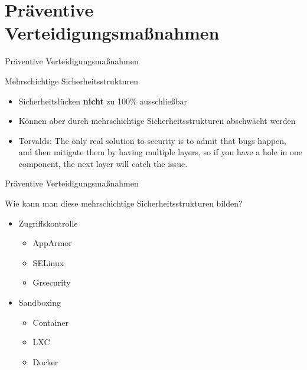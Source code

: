 \newcommand{\gqq}[1]{\glqq#1\grqq}

\section{Präventive Verteidigungsmaßnahmen}

\begin{frame}{Präventive Verteidigungsmaßnahmen}
  \begin{block}{Mehrschichtige Sicherheitsstrukturen}
    \begin{itemize}[<+->]
      \item Sicherheitslücken \textbf{nicht} zu 100\% ausschließbar
      \item Können aber durch mehrschichtige Sicherheitsstrukturen abschwächt werden
      \item Torvalds: \gqq{The only real solution to security is to admit that bugs happen, and then mitigate them by having multiple layers, so if you have a hole in one component, the next layer will catch the issue.} \footnotemark
    \end{itemize}
  \end{block}

\end{frame}

\begin{frame}{Präventive Verteidigungsmaßnahmen}
  \begin{block}{Wie kann man diese mehrschichtige Sicherheitsstrukturen bilden?}
    \begin{itemize}[<+->]
      \item Zugriffskontrolle
      \begin{itemize}[<+->]
        \item AppArmor
        \item SELinux
        \item Grsecurity
      \end{itemize}
      \item Sandboxing
      \begin{itemize}[<+->]
        \item Container
        \item LXC
        \item Docker
      \end{itemize}
    \end{itemize}
  \end{block}
\end{frame}

